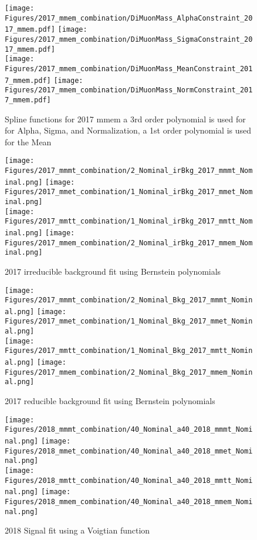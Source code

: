 \begin{figure}[ht!b]
    \centering 
    \texttt{[image: Figures/2017\_mmem\_combination/DiMuonMass\_AlphaConstraint\_2017\_mmem.pdf]}
    \texttt{[image: Figures/2017\_mmem\_combination/DiMuonMass\_SigmaConstraint\_2017\_mmem.pdf]}\\
    \texttt{[image: Figures/2017\_mmem\_combination/DiMuonMass\_MeanConstraint\_2017\_mmem.pdf]}
    \texttt{[image: Figures/2017\_mmem\_combination/DiMuonMass\_NormConstraint\_2017\_mmem.pdf]}\\
    \caption{\label{fig:spline_2017_mmem} Spline functions for 2017 mmem a 3rd order polynomial is used for  for Alpha, Sigma, and Normalization, a 1st order polynomial is used for the Mean}
\end{figure}

\begin{figure}[ht!b]
  \centering
  \texttt{[image: Figures/2017\_mmmt\_combination/2\_Nominal\_irBkg\_2017\_mmmt\_Nominal.png]}
  \texttt{[image: Figures/2017\_mmet\_combination/1\_Nominal\_irBkg\_2017\_mmet\_Nominal.png]}\\
  \texttt{[image: Figures/2017\_mmtt\_combination/1\_Nominal\_irBkg\_2017\_mmtt\_Nominal.png]}
  \texttt{[image: Figures/2017\_mmem\_combination/2\_Nominal\_irBkg\_2017\_mmem\_Nominal.png]}\\
    \caption{\label{fig:2017_fit_ZZ} 2017 irreducible background fit using Bernstein polynomials}
\end{figure}
\begin{figure}[ht!b]
  \centering
  \texttt{[image: Figures/2017\_mmmt\_combination/2\_Nominal\_Bkg\_2017\_mmmt\_Nominal.png]}
  \texttt{[image: Figures/2017\_mmet\_combination/1\_Nominal\_Bkg\_2017\_mmet\_Nominal.png]}\\
  \texttt{[image: Figures/2017\_mmtt\_combination/1\_Nominal\_Bkg\_2017\_mmtt\_Nominal.png]}
  \texttt{[image: Figures/2017\_mmem\_combination/2\_Nominal\_Bkg\_2017\_mmem\_Nominal.png]}\\
    \caption{\label{fig:2017_fit_FF} 2017 reducible background fit using Bernstein polynomials}
\end{figure}

\begin{figure}[ht!b]
  \centering
  \texttt{[image: Figures/2018\_mmmt\_combination/40\_Nominal\_a40\_2018\_mmmt\_Nominal.png]}
  \texttt{[image: Figures/2018\_mmet\_combination/40\_Nominal\_a40\_2018\_mmet\_Nominal.png]}\\
  \texttt{[image: Figures/2018\_mmtt\_combination/40\_Nominal\_a40\_2018\_mmtt\_Nominal.png]}
  \texttt{[image: Figures/2018\_mmem\_combination/40\_Nominal\_a40\_2018\_mmem\_Nominal.png]}\\
    \caption{\label{fig:2018_fit_sig} 2018 Signal fit using a Voigtian function}
\end{figure}

